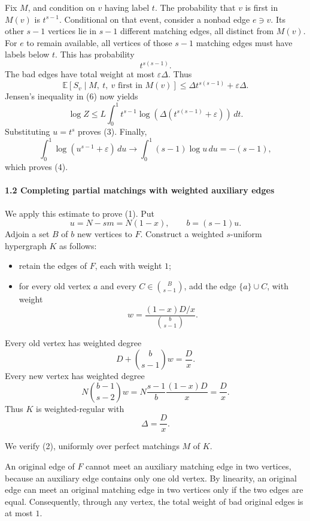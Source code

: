 \documentclass[
  11pt,
  a4paper,
]{article}
\providecommand{\tightlist}{%
  \setlength{\itemsep}{0pt}\setlength{\parskip}{0pt}}
\begin{document}
Fix \(M\), and condition on \(v\) having label \(t\). The probability
that \(v\) is first in \(M(v)\) is \(t^{s-1}\). Conditional on that
event, consider a nonbad edge \(e\ni v\). Its other \(s-1\) vertices lie
in \(s-1\) different matching edges, all distinct from \(M(v)\). For
\(e\) to remain available, all vertices of those \(s-1\) matching edges
must have labels below \(t\). This has probability \[
t^{s(s-1)}.
\] The bad edges have total weight at most \(\varepsilon\Delta\). Thus
\[
\mathbb E[S_v\mid M,\ t,\ v\text{ first in }M(v)]
\le
\Delta t^{s(s-1)}+\varepsilon\Delta.
\] Jensen's inequality in (6) now yields \[
\log Z\le
L\int_0^1 t^{s-1}
\log\!\left(\Delta(t^{s(s-1)}+\varepsilon)\right)\,dt.
\] Substituting \(u=t^s\) proves (3). Finally, \[
\int_0^1\log(u^{s-1}+\varepsilon)\,du
\longrightarrow
\int_0^1(s-1)\log u\,du=-(s-1),
\] which proves (4).

\paragraph{1.2 Completing partial matchings with weighted auxiliary
edges}\label{completing-partial-matchings-with-weighted-auxiliary-edges}

We apply this estimate to prove (1). Put \[
u=N-sm=N(1-x),\qquad b=(s-1)u.
\] Adjoin a set \(B\) of \(b\) new vertices to \(F\). Construct a
weighted \(s\)-uniform hypergraph \(K\) as follows:

\begin{itemize}
\tightlist
\item
  retain the edges of \(F\), each with weight \(1\);
\item
  for every old vertex \(a\) and every \(C\in\binom{B}{s-1}\), add the
  edge \(\{a\}\cup C\), with weight \[
  w=\frac{(1-x)D/x}{\binom{b}{s-1}}.
  \]
\end{itemize}

Every old vertex has weighted degree \[
D+\binom{b}{s-1}w=\frac D x.
\] Every new vertex has weighted degree \[
N\binom{b-1}{s-2}w
=
N\frac{s-1}{b}\frac{(1-x)D}{x}
=\frac D x.
\] Thus \(K\) is weighted-regular with \[
\Delta=\frac D x.
\]

We verify (2), uniformly over perfect matchings \(M\) of \(K\).

An original edge of \(F\) cannot meet an auxiliary matching edge in two
vertices, because an auxiliary edge contains only one old vertex. By
linearity, an original edge can meet an original matching edge in two
vertices only if the two edges are equal. Consequently, through any
vertex, the total weight of bad original edges is at most \(1\).
\end{document}
